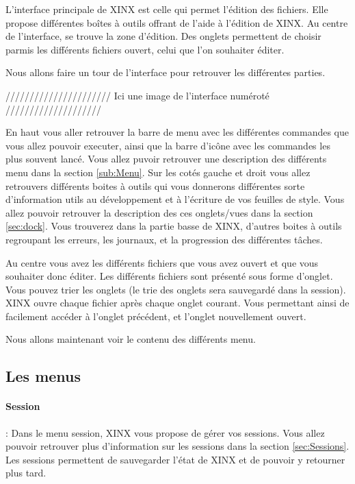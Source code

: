 \documentclass[a4paper,10pt,twoside]{book}
\begin{document}
L'interface principale de XINX est celle qui permet l'édition des fichiers. Elle propose différentes boîtes à outils offrant de l'aide à l'édition de XINX. Au centre de l'interface, se trouve la zone d'édition. Des onglets permettent de choisir parmis les différents fichiers ouvert, celui que l'on souhaiter éditer.

Nous allons faire un tour de l'interface pour retrouver les différentes parties.

////////////////////// Ici une image de l'interface numéroté ////////////////////


En haut vous aller retrouver la barre de menu avec les différentes commandes que vous allez pouvoir executer, ainsi que la barre d'icône avec les commandes les plus souvent lancé. Vous allez puvoir retrouver une description des différents menu dans la section \ref{sub:Menu}. Sur les cotés gauche et droit vous allez retrouvers différents boites à outils qui vous donnerons différentes sorte d'information utils au développement et à l'écriture de vos feuilles de style. Vous allez pouvoir retrouver la description des ces onglets/vues dans la section \ref{sec:dock}. Vous trouverez dans la partie basse de XINX, d'autres boites à outils regroupant les erreurs, les journaux, et la progression des différentes tâches.

Au centre vous avez les différents fichiers que vous avez ouvert et que vous souhaiter donc éditer. Les différents fichiers sont présenté sous forme d'onglet. Vous pouvez trier les onglets (le trie des onglets sera sauvegardé dans la session). XINX ouvre chaque fichier après chaque onglet courant. Vous permettant ainsi de facilement accéder à l'onglet précédent, et l'onglet nouvellement ouvert.

Nous allons maintenant voir le contenu des différents menu.

\subsection{Les menus}
\label{sub:menu}

\paragraph{Session} : Dans le menu session, XINX vous propose de gérer vos sessions. Vous allez pouvoir retrouver plus d'information sur les sessions dans la section \ref{sec:Sessions}. Les sessions permettent de sauvegarder l'état de XINX et de pouvoir y retourner plus tard.
\end{document}
